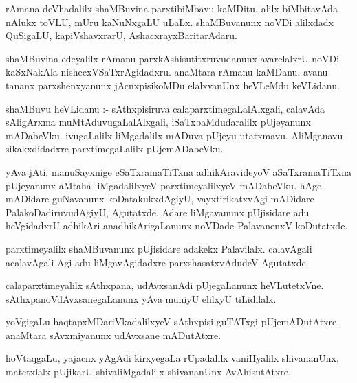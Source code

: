 \documentclass{article}
\begin{document}
\begin{mn}
rAmana  deVhadalilx  shaMBuvina  parxtibiMbavu  kaMDitu.  alilx  biMbitavAda  nAlukx toVLU,  mUru kaNuNxgaLU  uLaLx.  
shaMBuvanunx  noVDi  alilxdadx  QuSigaLU,  kapiVshavxrarU,  AshacxrayxBaritarAdaru.
\end{mn}

\begin{mn}
shaMBuvina  edeyalilx  rAmanu  parxkAshisutitxruvudanunx  avarelalxrU  noVDi kaSxNakAla  nishecxVSaTxrAgidadxru.  anaMtara  rAmanu  
kaMDanu.  avanu  tananx  parxshenxyanunx  jAcnxpisikoMDu  elalxvanUnx  heVLeMdu  keVLidanu.
\end{mn}

\begin{mn}
shaMBuvu  heVLidanu :- sAthxpisiruva  calaparxtimegaLalAlxgali,  calavAda  sAligArxma  muMtAduvugaLalAlxgali,  iSaTxbaMdudaralilx  
pUjeyanunx  mADabeVku.  ivugaLalilx  liMgadalilx  mADuva  pUjeyu  utatxmavu.  AliMganavu  sikakxdidadxre  parxtimegaLalilx  pUjemADabeVku.
\end{mn}

\begin{mn}
yAva  jAti,  manuSayxnige  eSaTxramaTiTxna  adhikAravideyoV  aSaTxramaTiTxna  pUjeyanunx  aMtaha  liMgadalilxyeV  parxtimeyalilxyeV  mADabeVku.  
hAge  mADidare  guNavanunx  koDatakukxdAgiyU,  vayxtirikatxvAgi  mADidare  PalakoDadiruvudAgiyU,  Agutatxde.  Adare  liMgavanunx  pUjisidare  adu  
heVgidadxrU  adhikAri  anadhikArigaLanunx  noVDade  PalavanenxV  koDutatxde.
\end{mn}

\begin{mn}
parxtimeyalilx  shaMBuvanunx  pUjisidare  adakekx  Palavilalx.  calavAgali  acalavAgali  Agi  adu  liMgavAgidadxre  parxshasatxvAdudeV  Agutatxde.
\end{mn}

\begin{mn}
calaparxtimeyalilx  sAthxpana,  udAvxsanAdi  pUjegaLanunx  heVLutetxVne.  sAthxpanoVdAvxsanegaLanunx  yAva  muniyU  elilxyU  tiLidilalx.
\end{mn}

\begin{mn}
yoVgigaLu  haqtapxMDariVkadalilxyeV  sAthxpisi  guTATxgi  pUjemADutAtxre.  anaMtara  sAvxmiyanunx  udAvxsane  mADutAtxre.
\end{mn}

\begin{mn}
hoVtaqgaLu,  yajacnx yAgAdi  kirxyegaLa  rUpadalilx  vaniHyalilx  shivananUnx,  matetxlalx  pUjikarU  shivaliMgadalilx  shivananUnx  AvAhisutAtxre.
\end{mn}
\end{document}
